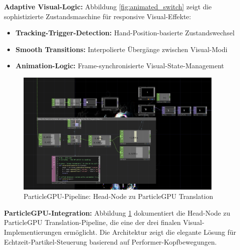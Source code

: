 \textbf{Adaptive Visual-Logic:}
Abbildung \ref{fig:animated_switch} zeigt die sophistizierte Zustandsmaschine für responsive Visual-Effekte:
\begin{itemize}
    \item \textbf{Tracking-Trigger-Detection:} Hand-Position-basierte Zustandswechsel
    \item \textbf{Smooth Transitions:} Interpolierte Übergänge zwischen Visual-Modi
    \item \textbf{Animation-Logic:} Frame-synchronisierte Visual-State-Management
\end{itemize}

\begin{figure}[H]
    \centering
    \includegraphics[width=0.9\textwidth]{images/docupictures/NoisyBlob_HEAD_to_ParticleGPU_Translate.png}
    \caption{ParticleGPU-Pipeline: Head-Node zu ParticleGPU Translation}
    \label{fig:particle_translation}
\end{figure}

\textbf{ParticleGPU-Integration:}
Abbildung \ref{fig:particle_translation} dokumentiert die Head-Node zu ParticleGPU Translation-Pipeline, die eine der drei finalen Visual-Implementierungen ermöglicht. Die Architektur zeigt die elegante Lösung für Echtzeit-Partikel-Steuerung basierend auf Performer-Kopfbewegungen.


